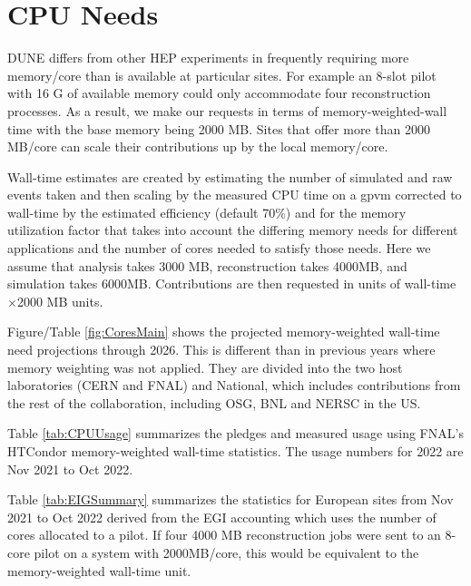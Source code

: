\documentclass[12pt]{article}
\begin{document}
\clearpage
\section{CPU Needs}

DUNE differs from other HEP experiments in frequently requiring more memory/core than is available at particular sites.  For example an 8-slot pilot with 16 G of available memory could only accommodate four reconstruction processes.   As a result, we make our requests in terms of memory-weighted-wall time with the base memory being 2000 MB.  Sites that offer more than 2000 MB/core can scale their contributions up by the local memory/core.

Wall-time estimates are created by estimating the number of simulated and raw events taken and then scaling by the measured CPU time on a gpvm corrected to wall-time by the estimated efficiency (default 70\%) and for the memory utilization factor that takes into account the differing memory needs for different applications and the number of cores needed to satisfy those needs.  Here we assume that analysis takes 3000 MB, reconstruction takes 4000MB, and simulation takes 6000MB.  Contributions are then requested in units of wall-time$\times$2000 MB units. 

Figure/Table \ref{fig:CoresMain} shows the projected memory-weighted wall-time need projections through 2026.  This is different than in previous years where memory weighting was not applied.   They are divided into the two host laboratories (CERN and FNAL) and National, which includes contributions from the rest of the collaboration, including OSG, BNL and NERSC in the US. 


Table \ref{tab:CPUUsage} summarizes the pledges\cite{CCB2022} and measured usage using FNAL's  HTCondor memory-weighted wall-time statistics\cite{fifemonDUNE}.  The  usage numbers for 2022 are Nov 2021 to Oct 2022. 

Table \ref{tab:EIGSummary} summarizes the statistics for European sites from Nov 2021 to Oct 2022 derived from the EGI accounting\cite{EGI2022} which uses the number of cores allocated to a pilot.   If four 4000 MB reconstruction jobs were sent to an 8-core pilot on a system with 2000MB/core, this would be equivalent to the memory-weighted wall-time unit.   
\end{document}
